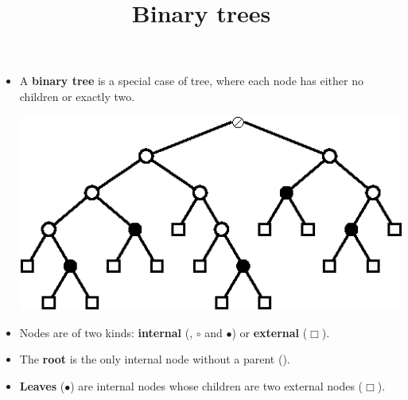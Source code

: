\documentclass[wide]{slides}
\begin{document}
\begin{slide}
  \title{Binary trees}

  \begin{itemize}

    \item A \textbf{binary tree} is a special case of tree, where each
      node has either no children or exactly two.
      \begin{center}
        \includegraphics{bt_shape.eps}
      \end{center}

    \item Nodes are of two kinds: \textbf{internal}
      ({\tiny\raisebox{1pt}{\(\oslash\)}}, \(\circ\) and \(\bullet\))
      or \textbf{external} (\(\scriptstyle \Box\)).

    \item The \textbf{root} is the only internal node without a parent
      ({\tiny\raisebox{1pt}{\(\oslash\)}}).

    \item \textbf{Leaves} (\(\bullet\)) are internal nodes whose
      children are two external nodes (\(\scriptstyle \Box\)).

  \end{itemize}

\end{slide}
\end{document}
